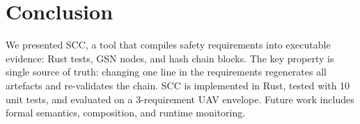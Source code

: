 \section{Conclusion}
We presented SCC, a tool that compiles safety requirements into
executable evidence: Rust tests, GSN nodes, and hash chain blocks.
The key property is single source of truth: changing one line in
the requirements regenerates all artefacts and re-validates the
chain. SCC is implemented in Rust, tested with 10 unit tests, and
evaluated on a 3-requirement UAV envelope. Future work includes
formal semantics, composition, and runtime monitoring.
